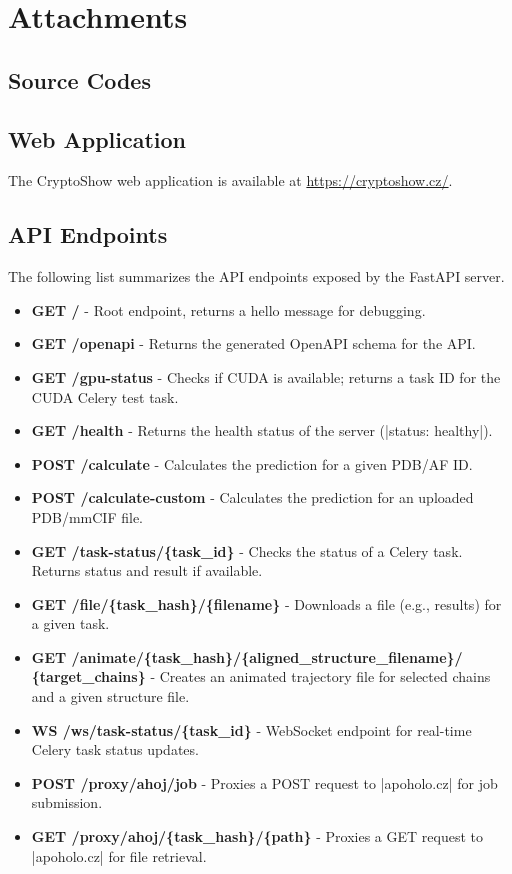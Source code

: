 \chapter{Attachments}

\section{Source Codes}
\label{sec:source-codes}


\section{Web Application}
\label{sec:web-application}

The CryptoShow web application is available at \url{https://cryptoshow.cz/}.

\section{API Endpoints}
\label{sec:api-endpoints}

The following list summarizes the API endpoints exposed by the FastAPI server.

\begin{itemize}
    \item \textbf{GET /} - Root endpoint, returns a hello message for debugging.
    \item \textbf{GET /openapi} - Returns the generated OpenAPI schema for the API.
    \item \textbf{GET /gpu-status} - Checks if CUDA is available; returns a task ID for the CUDA Celery test task.
    \item \textbf{GET /health} - Returns the health status of the server (\inline|status: healthy|).
    \item \textbf{POST /calculate} - Calculates the prediction for a given PDB/AF ID.
    \item \textbf{POST /calculate-custom} - Calculates the prediction for an uploaded PDB/mmCIF file.
    \item \textbf{GET /task-status/\{task\_id\}} - Checks the status of a Celery task. Returns status and result if available.
    \item \textbf{GET /file/\{task\_hash\}/\{filename\}} - Downloads a file (e.g., results) for a given task.
    \item \textbf{GET /animate/\{task\_hash\}/\{aligned\_structure\_filename\}/} \textbf{\{target\_chains\}} - Creates an animated trajectory file for selected chains and a given structure file.
    \item \textbf{WS /ws/task-status/\{task\_id\}} - WebSocket endpoint for real-time Celery task status updates.
    \item \textbf{POST /proxy/ahoj/job} - Proxies a POST request to \inline|apoholo.cz| for job submission.
    \item \textbf{GET /proxy/ahoj/\{task\_hash\}/\{path\}} - Proxies a GET request to \inline|apoholo.cz| for file retrieval.
\end{itemize}
